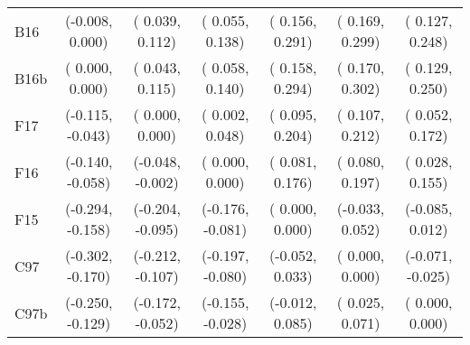 \begin{table}[!ht]
\begin{tabular}{lcccccc}
  B16   & (-0.008,  0.000) & ( 0.039,  0.112) & ( 0.055,  0.138) & ( 0.156,  0.291) & ( 0.169,  0.299) & ( 0.127,  0.248) \\
  B16b  & ( 0.000,  0.000) & ( 0.043,  0.115) & ( 0.058,  0.140) & ( 0.158,  0.294) & ( 0.170,  0.302) & ( 0.129,  0.250) \\
  F17   & (-0.115, -0.043) & ( 0.000,  0.000) & ( 0.002,  0.048) & ( 0.095,  0.204) & ( 0.107,  0.212) & ( 0.052,  0.172) \\
  F16   & (-0.140, -0.058) & (-0.048, -0.002) & ( 0.000,  0.000) & ( 0.081,  0.176) & ( 0.080,  0.197) & ( 0.028,  0.155) \\
  F15   & (-0.294, -0.158) & (-0.204, -0.095) & (-0.176, -0.081) & ( 0.000,  0.000) & (-0.033,  0.052) & (-0.085,  0.012) \\
  C97   & (-0.302, -0.170) & (-0.212, -0.107) & (-0.197, -0.080) & (-0.052,  0.033) & ( 0.000,  0.000) & (-0.071, -0.025) \\
  C97b  & (-0.250, -0.129) & (-0.172, -0.052) & (-0.155, -0.028) & (-0.012,  0.085) & ( 0.025,  0.071) & ( 0.000,  0.000) \\
  \bottomrule
\end{tabular}
\label{tbl:bootstrap}
\end{table}
